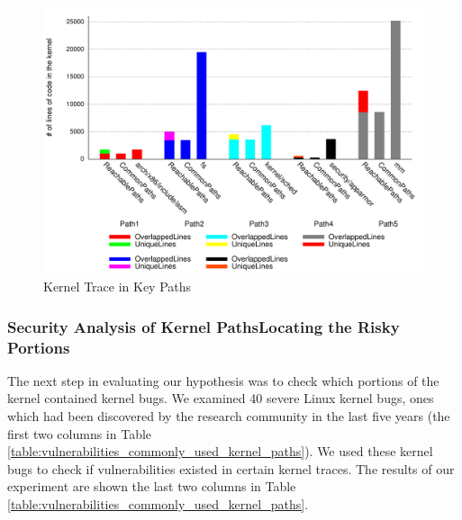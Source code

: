 \begin{figure}
\centering
\includegraphics[width=1.0\columnwidth]{diagram/lind_oakland16_diagram_02.pdf}
\caption{Kernel Trace in Key Paths}
\label{fig:key_paths_trace}
\end{figure}

\subsubsection{Security Analysis of Kernel Paths\textendash Locating the
Risky Portions}

The next step in evaluating our hypothesis was to check which portions of
the kernel contained kernel bugs. We examined 40 severe Linux kernel
bugs, 
ones which had been discovered by the research community in the last five
years (the first two columns in Table 
\ref{table:vulnerabilities_commonly_used_kernel_paths}). 
We used these kernel bugs to check if vulnerabilities existed in certain
kernel traces.   
The results of our experiment are shown the last two columns in Table
\ref{table:vulnerabilities_commonly_used_kernel_paths}.


